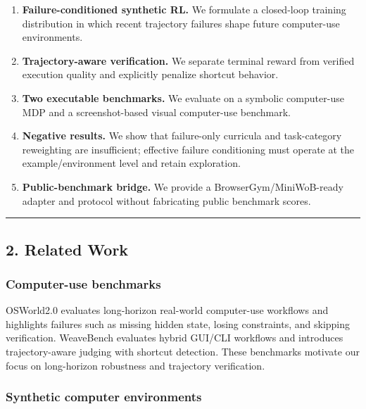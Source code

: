 \documentclass[
]{article}
\providecommand{\tightlist}{%
  \setlength{\itemsep}{0pt}\setlength{\parskip}{0pt}}
\begin{document}
\begin{enumerate}
\def\labelenumi{\arabic{enumi}.}
\tightlist
\item
  \textbf{Failure-conditioned synthetic RL.} We formulate a closed-loop
  training distribution in which recent trajectory failures shape future
  computer-use environments.
\item
  \textbf{Trajectory-aware verification.} We separate terminal reward
  from verified execution quality and explicitly penalize shortcut
  behavior.
\item
  \textbf{Two executable benchmarks.} We evaluate on a symbolic
  computer-use MDP and a screenshot-based visual computer-use benchmark.
\item
  \textbf{Negative results.} We show that failure-only curricula and
  task-category reweighting are insufficient; effective failure
  conditioning must operate at the example/environment level and retain
  exploration.
\item
  \textbf{Public-benchmark bridge.} We provide a
  BrowserGym/MiniWoB-ready adapter and protocol without fabricating
  public benchmark scores.
\end{enumerate}

\begin{center}\rule{0.5\linewidth}{0.5pt}\end{center}

\subsection{2. Related Work}\label{related-work}

\subsubsection{Computer-use benchmarks}\label{computer-use-benchmarks}

OSWorld2.0 evaluates long-horizon real-world computer-use workflows and
highlights failures such as missing hidden state, losing constraints,
and skipping verification. WeaveBench evaluates hybrid GUI/CLI workflows
and introduces trajectory-aware judging with shortcut detection. These
benchmarks motivate our focus on long-horizon robustness and trajectory
verification.

\subsubsection{Synthetic computer
environments}\label{synthetic-computer-environments}
\end{document}

